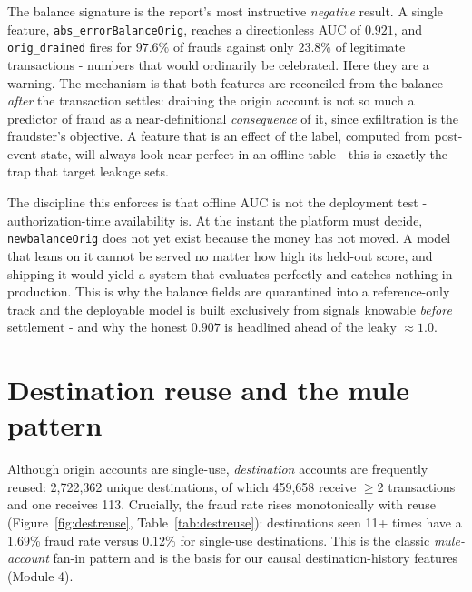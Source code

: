 \documentclass[11pt,a4paper]{report}
\newcommand{\code}[1]{\texttt{\small #1}}
\begin{document}
The balance signature is the report's most instructive \emph{negative} result. A single feature, \code{abs\_errorBalanceOrig}, reaches a directionless AUC of $0.921$, and \code{orig\_drained} fires for $97.6\%$ of frauds against only $23.8\%$ of legitimate transactions - numbers that would ordinarily be celebrated. Here they are a warning. The mechanism is that both features are reconciled from the balance \emph{after} the transaction settles: draining the origin account is not so much a predictor of fraud as a near-definitional \emph{consequence} of it, since exfiltration is the fraudster's objective. A feature that is an effect of the label, computed from post-event state, will always look near-perfect in an offline table - this is exactly the trap that target leakage sets.

The discipline this enforces is that offline AUC is not the deployment test - authorization-time availability is. At the instant the platform must decide, \code{newbalanceOrig} does not yet exist because the money has not moved. A model that leans on it cannot be served no matter how high its held-out score, and shipping it would yield a system that evaluates perfectly and catches nothing in production. This is why the balance fields are quarantined into a reference-only track and the deployable model is built exclusively from signals knowable \emph{before} settlement - and why the honest $0.907$ is headlined ahead of the leaky $\approx1.0$.

\section{Destination reuse and the mule pattern}

Although origin accounts are single-use, \emph{destination} accounts are frequently reused:
2{,}722{,}362 unique destinations, of which 459{,}658 receive $\ge$2 transactions and one
receives 113. Crucially, the fraud rate rises monotonically with reuse
(Figure~\ref{fig:destreuse}, Table~\ref{tab:destreuse}): destinations seen 11+ times have a
1.69\% fraud rate versus 0.12\% for single-use destinations. This is the classic
\emph{mule-account} fan-in pattern and is the basis for our causal destination-history
features (Module 4).
\end{document}
